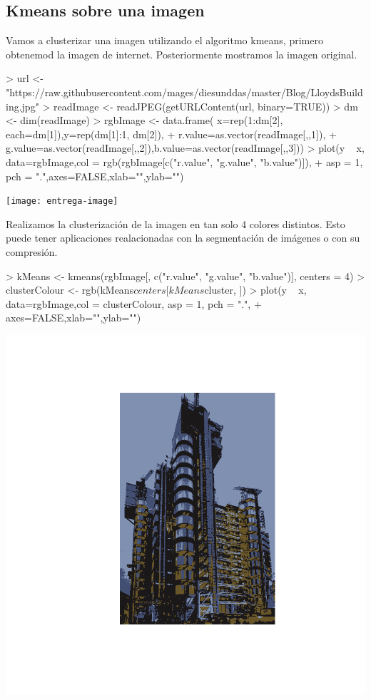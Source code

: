 \documentclass [a4paper] {article}
\begin{document}
\subsection{Kmeans sobre una imagen}
Vamos a clusterizar una imagen utilizando el algoritmo kmeans, primero obtenemod la imagen de internet.
Posteriormente mostramos la imagen original.
\begin{center}
\begin{Schunk}
\begin{Sinput}
> url <- "https://raw.githubusercontent.com/mages/diesunddas/master/Blog/LloydsBuilding.jpg"
> readImage <- readJPEG(getURLContent(url, binary=TRUE))
> dm <- dim(readImage)
> rgbImage <- data.frame( x=rep(1:dm[2], each=dm[1]),y=rep(dm[1]:1, dm[2]),
+                         r.value=as.vector(readImage[,,1]),
+ g.value=as.vector(readImage[,,2]),b.value=as.vector(readImage[,,3]))
> plot(y ~ x, data=rgbImage,col = rgb(rgbImage[c("r.value", "g.value", "b.value")]),
+             asp = 1, pch = ".",axes=FALSE,xlab="",ylab="")
\end{Sinput}
\end{Schunk}
\texttt{[image: entrega-image]}
\end{center}
Realizamos la clusterización de la imagen en tan solo 4 colores distintos.
Esto puede tener aplicaciones realacionadas con la segmentación de imágenes o con su compresión.
\begin{center}
\begin{Schunk}
\begin{Sinput}
> kMeans <- kmeans(rgbImage[, c("r.value", "g.value", "b.value")], centers = 4)
> clusterColour <- rgb(kMeans$centers[kMeans$cluster, ])
> plot(y ~ x, data=rgbImage,col = clusterColour, asp = 1, pch = ".",
+             axes=FALSE,xlab="",ylab="")
\end{Sinput}
\end{Schunk}
\includegraphics{entrega-image_kmeans}
\end{center}
\end{document}
